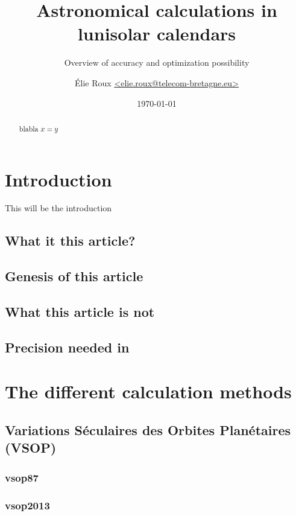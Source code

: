 \documentclass[%
a4paper,%
pagesize,%
12pt,%
parskip=off,%
bibliography=totoc,%
numbers=noenddot,%
DIV=12,%
twoside=semi,%
headings=small,%
]{scrartcl}
\title{Astronomical calculations in lunisolar calendars}
\subtitle{Overview of accuracy and optimization possibility}
\author{Élie Roux \href{mailto:elie.roux@telecom-bretagne.eu}{<elie.roux@telecom-bretagne.eu>}}
\date{\today}
\begin{document}
\maketitle

\begin{abstract}
blabla $x=y$
\end{abstract}

\tableofcontents
\newpage

\section{Introduction}

This will be the introduction

\subsection{What it this article?}

\subsection{Genesis of this article}

\subsection{What this article is not}

\subsection{Precision needed in }

\section{The different calculation methods}

\subsection{Variations Séculaires des Orbites Planétaires (VSOP)}

\subsubsection{vsop87}

\subsubsection{vsop2013}
\end{document}
